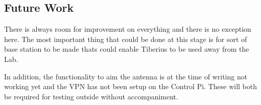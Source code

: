 \subsection{Future Work}
There is always room for improvement on everything and there is no exception here. The most important thing that could be done at this stage is for sort of base station to be made thats could enable Tiberius to be used away from the Lab. 

In addition, the functionality to aim the antenna is at the time of writing not working yet and the VPN has not been setup on the Control Pi. These will both be required for testing outside without accompaniment.

